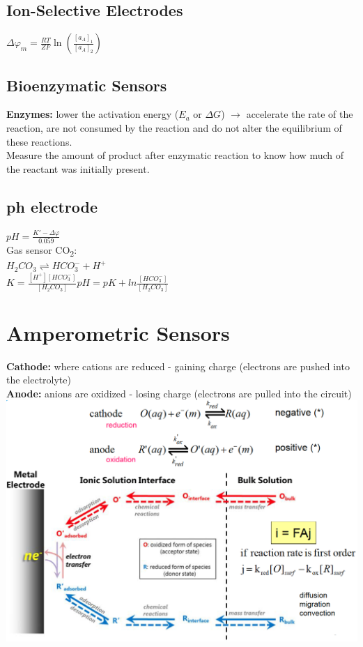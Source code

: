 \documentclass[9pt]{article}
\begin{document}
\begin{multicols}{2}
 \subsection{Ion-Selective Electrodes}
 $\Delta \varphi _m = \frac{RT}{ZF} \ln (\frac{[a_A]_1}{[a_A]_2})$
 
 
 \subsection{Bioenzymatic Sensors}
 \textbf{Enzymes: }lower the activation energy ($E_a$ or $\Delta G$) $\rightarrow$ accelerate the rate of the reaction, are not consumed by the reaction and do not alter the equilibrium of these reactions.\\
Measure the amount of product after enzymatic reaction to know how much of the reactant was initially present.
\subsection{ph electrode}
		$pH=\frac{K'-\Delta\varphi}{0.059}$\\
Gas sensor CO\textsubscript{2}:\\
			$H_2CO_3\rightleftharpoons HCO_3^-+H^+$\\
			$K=\frac{[H^+][HCO_3^-]}{[H_2CO_3]}$\enspace\enspace $pH=pK+ln\frac{[HCO_3^-]}{[H_2CO_3]}$
\section{Amperometric Sensors}
\textbf{Cathode: }where cations are reduced - gaining charge (electrons are pushed into the electrolyte)\\
\textbf{Anode: }anions are oxidized - losing charge (electrons are pulled into the circuit)\\
\includegraphics[scale=0.2]{Images/redox_current.png}

\end{multicols}
\end{document}

